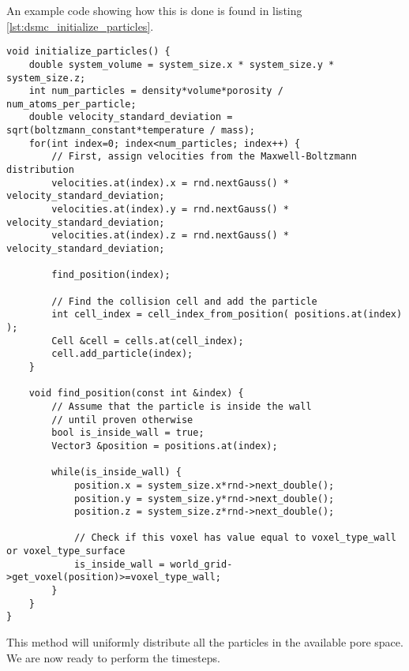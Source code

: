  An example code showing how this is done is found in listing \ref{lst:dsmc_initialize_particles}.
\begin{lstlisting}[caption=Particle initialization., label=lst:dsmc_initialize_particles]
void initialize_particles() {
	double system_volume = system_size.x * system_size.y * system_size.z;
	int num_particles = density*volume*porosity / num_atoms_per_particle;
	double velocity_standard_deviation = sqrt(boltzmann_constant*temperature / mass);
	for(int index=0; index<num_particles; index++) {
		// First, assign velocities from the Maxwell-Boltzmann distribution
		velocities.at(index).x = rnd.nextGauss() * velocity_standard_deviation;
		velocities.at(index).y = rnd.nextGauss() * velocity_standard_deviation;
		velocities.at(index).z = rnd.nextGauss() * velocity_standard_deviation;

		find_position(index);

		// Find the collision cell and add the particle
		int cell_index = cell_index_from_position( positions.at(index) );
		Cell &cell = cells.at(cell_index);
        cell.add_particle(index);
	}

	void find_position(const int &index) {
		// Assume that the particle is inside the wall
		// until proven otherwise
	    bool is_inside_wall = true;
	    Vector3 &position = positions.at(index);
	    
	    while(is_inside_wall) {
	        position.x = system_size.x*rnd->next_double();
	        position.y = system_size.y*rnd->next_double();
	        position.z = system_size.z*rnd->next_double();

	        // Check if this voxel has value equal to voxel_type_wall or voxel_type_surface
	        is_inside_wall = world_grid->get_voxel(position)>=voxel_type_wall;
	    }
	}
}
\end{lstlisting}
This method will uniformly distribute all the particles in the available pore space. We are now ready to perform the timesteps.